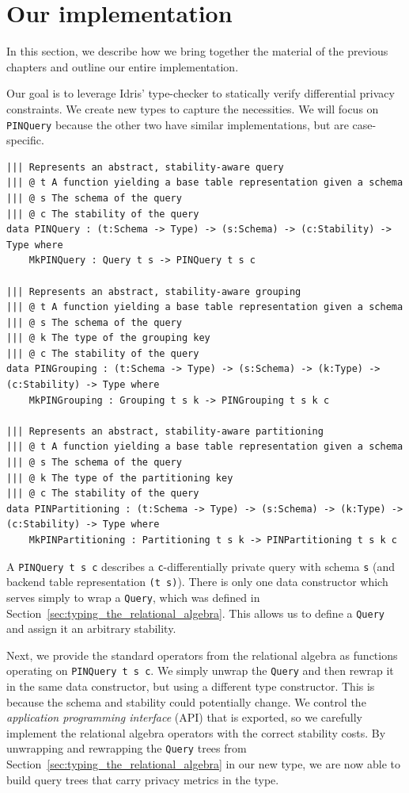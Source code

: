 \documentclass[12pt]{article}
\begin{document}
\section{Our implementation}\label{sec:our_implementation}

In this section, we describe how we bring together the material of the previous chapters and outline our entire implementation.

Our goal is to leverage Idris' type-checker to statically verify differential privacy constraints.
We create new types to capture the necessities.
We will focus on \texttt{PINQuery} because the other two have similar implementations, but are case-specific.

\begin{lstlisting}[caption={Representing privacy-aware queries},label={lst:pinqueries}]
||| Represents an abstract, stability-aware query
||| @ t A function yielding a base table representation given a schema
||| @ s The schema of the query
||| @ c The stability of the query
data PINQuery : (t:Schema -> Type) -> (s:Schema) -> (c:Stability) -> Type where
    MkPINQuery : Query t s -> PINQuery t s c

||| Represents an abstract, stability-aware grouping
||| @ t A function yielding a base table representation given a schema
||| @ s The schema of the query
||| @ k The type of the grouping key
||| @ c The stability of the query
data PINGrouping : (t:Schema -> Type) -> (s:Schema) -> (k:Type) -> (c:Stability) -> Type where
    MkPINGrouping : Grouping t s k -> PINGrouping t s k c

||| Represents an abstract, stability-aware partitioning
||| @ t A function yielding a base table representation given a schema
||| @ s The schema of the query
||| @ k The type of the partitioning key
||| @ c The stability of the query
data PINPartitioning : (t:Schema -> Type) -> (s:Schema) -> (k:Type) -> (c:Stability) -> Type where
    MkPINPartitioning : Partitioning t s k -> PINPartitioning t s k c
\end{lstlisting}

A \texttt{PINQuery t s c} describes a \texttt{c}-differentially private query with schema \texttt{s} (and backend table representation \texttt{(t s)}).
There is only one data constructor which serves simply to wrap a \texttt{Query}, which was defined in Section~\ref{sec:typing_the_relational_algebra}.
This allows us to define a \texttt{Query} and assign it an arbitrary stability.

Next, we provide the standard operators from the relational algebra as functions operating on \texttt{PINQuery t s c}.
We simply unwrap the \texttt{Query} and then rewrap it in the same data constructor, but using a different type constructor.
This is because the schema and stability could potentially change.
We control the \textit{application programming interface} (API) that is exported, so we carefully implement the relational algebra operators with the correct stability costs.
By unwrapping and rewrapping the \texttt{Query} trees from Section~\ref{sec:typing_the_relational_algebra} in our new type, we are now able to build query trees that carry privacy metrics in the type.
\end{document}
